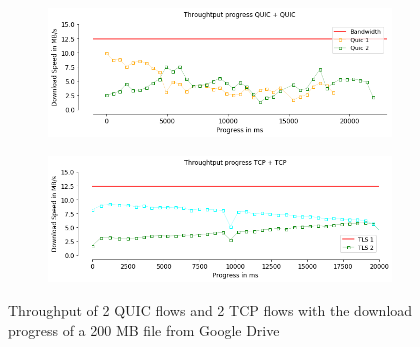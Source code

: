 \begin{frame}
\begin{figure}[!htb]
    \begin{subfigure}{0.45\textwidth}
        \includegraphics[width=\linewidth]{./plots/PI/throughput/ThroughtputprogressQUIC+QUIC.png}
    \end{subfigure}  
    \begin{subfigure}{0.45\textwidth}
        \includegraphics[width=\linewidth]{./plots/PI/throughput/ThroughtputprogressTCP+TCP.png}
    \end{subfigure}    
    \caption{Throughput of 2 QUIC flows and 2 TCP flows with the download progress of a 200 MB file from Google Drive}\label{fig:throughput-of-2g}
\end{figure}

\end{frame}
\clearpage

